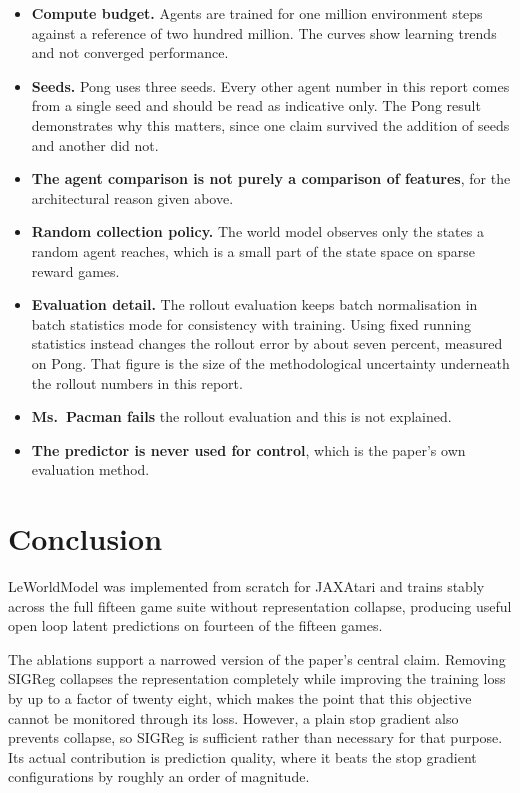 \documentclass[11pt,a4paper]{article}
\begin{document}
\begin{itemize}

\item \textbf{Compute budget.} Agents are trained for one million environment steps
against a reference of two hundred million. The curves show learning trends and not
converged performance.

\item \textbf{Seeds.} Pong uses three seeds. Every other agent number in this
report comes from a single seed and should be read as indicative only. The Pong
result demonstrates why this matters, since one claim survived the addition of
seeds and another did not.

\item \textbf{The agent comparison is not purely a comparison of features}, for the
architectural reason given above.

\item \textbf{Random collection policy.} The world model observes only the states a
random agent reaches, which is a small part of the state space on sparse reward
games.

\item \textbf{Evaluation detail.} The rollout evaluation keeps batch normalisation
in batch statistics mode for consistency with training. Using fixed running
statistics instead changes the rollout error by about seven percent, measured on
Pong. That figure is the size of the methodological uncertainty underneath the
rollout numbers in this report.

\item \textbf{Ms.\ Pacman fails} the rollout evaluation and this is not explained.

\item \textbf{The predictor is never used for control}, which is the paper's own
evaluation method.

\end{itemize}

\section{Conclusion}

LeWorldModel was implemented from scratch for JAXAtari and trains stably across the
full fifteen game suite without representation collapse, producing useful open loop
latent predictions on fourteen of the fifteen games.

The ablations support a narrowed version of the paper's central claim. Removing
SIGReg collapses the representation completely while improving the training loss by
up to a factor of twenty eight, which makes the point that this objective cannot be
monitored through its loss. However, a plain stop gradient also prevents collapse,
so SIGReg is sufficient rather than necessary for that purpose. Its actual
contribution is prediction quality, where it beats the stop gradient configurations
by roughly an order of magnitude.
\end{document}
